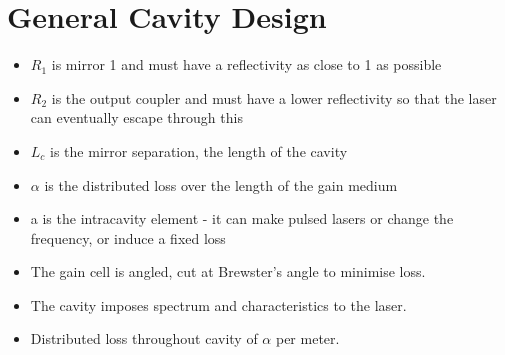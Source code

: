 \documentclass[a4paper, 11pt, normalem]{report}
\begin{document}
\section{General Cavity Design}
\begin{figure}[H]
    \centering
\end{figure}
\begin{itemize}
    \item $R_1$ is mirror 1 and must have a reflectivity as close to 1 as possible
    \item $R_2$ is the output coupler and must have a lower reflectivity so that the laser can eventually escape through this
    \item $L_c$ is the mirror separation, the length of the cavity
    \item $\alpha$ is the distributed loss over the length of the gain medium
    \item a is the intracavity element - it can make pulsed lasers or change the frequency, or induce a fixed loss
    \item The gain cell is angled, cut at Brewster's angle to minimise loss. 
    \item The cavity imposes spectrum and characteristics to the laser. 
    \item Distributed loss throughout cavity of $\alpha$ per meter.
\end{itemize}
\end{document}
